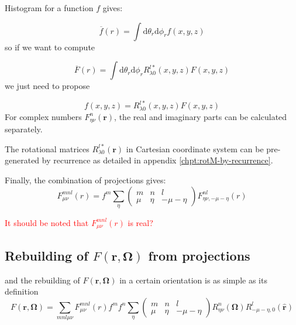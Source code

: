 Histogram for a function $f$ gives:

\begin{equation}
\overline{f}(r)=\int\mathrm{d}\theta_{r}\mathrm{d}\phi_{r}f(x,y,z)
\end{equation}
so if we want to compute

\begin{equation}
\overline{F}(r)=\int\mathrm{d}\theta_{r}\mathrm{d}\phi_{r}R_{\lambda0}^{l*}(x,y,z)F(x,y,z)
\end{equation}
we just need to propose 

\begin{equation}
f(x,y,z)=R_{\lambda0}^{l*}(x,y,z)F(x,y,z)
\end{equation}
For complex numbers $F_{\eta\nu}^{n}(\mathbf{r})$, the real and imaginary
parts can be calculated separately.

The rotational matrices $R_{\lambda0}^{l*}(\mathbf{r})$ in Cartesian
coordinate system can be pre-generated by recurrence as detailed in
appendix \ref{chpt:rotM-by-recurrence}. 

Finally, the combination of projections gives:
\begin{equation}
F_{\mu\nu}^{mnl}(r)=f^{m}\sum_{\eta}\left(\begin{array}{ccc}
m & n & l\\
\mu & \eta & -\mu-\eta
\end{array}\right)F_{\eta\nu,-\mu-\eta}^{nl}(r)
\end{equation}

\textcolor{red}{It should be noted that $F_{\mu\nu}^{mnl}(r)$ is
real?}

\subsection{Rebuilding of $F(\mathbf{r},\mathbf{\Omega})$ from projections}

and the rebuilding of $F(\mathbf{r},\mathbf{\Omega})$ in a certain
orientation is as simple as its definition
\begin{equation}
F(\mathbf{r},\mathbf{\Omega})=\sum_{mnl\mu\nu}F_{\mu\nu}^{mnl}(r)f^{m}f^{n}\sum_{\eta}\left(\begin{array}{ccc}
m & n & l\\
\mu & \eta & -\mu-\eta
\end{array}\right)R_{\eta\nu}^{n}(\mathbf{\Omega})R_{-\mu-\eta,0}^{l}(\mathbf{\hat{r}})\label{eq:bwd-1}
\end{equation}


